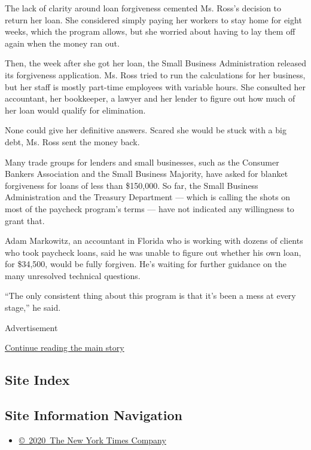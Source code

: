 The lack of clarity around loan forgiveness cemented Ms. Ross's decision
to return her loan. She considered simply paying her workers to stay
home for eight weeks, which the program allows, but she worried about
having to lay them off again when the money ran out.

Then, the week after she got her loan, the Small Business Administration
released its forgiveness application. Ms. Ross tried to run the
calculations for her business, but her staff is mostly part-time
employees with variable hours. She consulted her accountant, her
bookkeeper, a lawyer and her lender to figure out how much of her loan
would qualify for elimination.

None could give her definitive answers. Scared she would be stuck with a
big debt, Ms. Ross sent the money back.

Many trade groups for lenders and small businesses, such as the Consumer
Bankers Association and the Small Business Majority, have asked for
blanket forgiveness for loans of less than \$150,000. So far, the Small
Business Administration and the Treasury Department --- which is calling
the shots on most of the paycheck program's terms --- have not indicated
any willingness to grant that.

Adam Markowitz, an accountant in Florida who is working with dozens of
clients who took paycheck loans, said he was unable to figure out
whether his own loan, for \$34,500, would be fully forgiven. He's
waiting for further guidance on the many unresolved technical questions.

``The only consistent thing about this program is that it's been a mess
at every stage,'' he said.

Advertisement

\protect\hyperlink{after-bottom}{Continue reading the main story}

\hypertarget{site-index}{%
\subsection{Site Index}\label{site-index}}

\hypertarget{site-information-navigation}{%
\subsection{Site Information
Navigation}\label{site-information-navigation}}

\begin{itemize}
\tightlist
\item
  \href{https://help.nytimes3xbfgragh.onion/hc/en-us/articles/115014792127-Copyright-notice}{©~2020~The
  New York Times Company}
\end{itemize}

